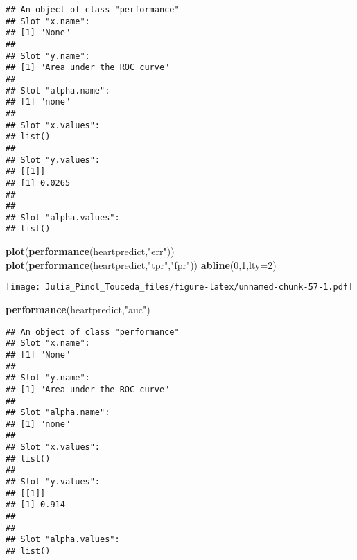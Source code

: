 \documentclass[]{article}
\newenvironment{Shaded}{\begin{snugshade}}{\end{snugshade}}
\newcommand{\KeywordTok}[1]{\textcolor[rgb]{0.13,0.29,0.53}{\textbf{#1}}}
\newcommand{\DataTypeTok}[1]{\textcolor[rgb]{0.13,0.29,0.53}{#1}}
\newcommand{\DecValTok}[1]{\textcolor[rgb]{0.00,0.00,0.81}{#1}}
\newcommand{\FloatTok}[1]{\textcolor[rgb]{0.00,0.00,0.81}{#1}}
\newcommand{\StringTok}[1]{\textcolor[rgb]{0.31,0.60,0.02}{#1}}
\newcommand{\OperatorTok}[1]{\textcolor[rgb]{0.81,0.36,0.00}{\textbf{#1}}}
\newcommand{\NormalTok}[1]{#1}
\begin{document}
\begin{Shaded}
\end{Shaded}

\begin{verbatim}
## An object of class "performance"
## Slot "x.name":
## [1] "None"
## 
## Slot "y.name":
## [1] "Area under the ROC curve"
## 
## Slot "alpha.name":
## [1] "none"
## 
## Slot "x.values":
## list()
## 
## Slot "y.values":
## [[1]]
## [1] 0.0265
## 
## 
## Slot "alpha.values":
## list()
\end{verbatim}

\begin{Shaded}
\begin{Highlighting}[]
\KeywordTok{plot}\NormalTok{(}\KeywordTok{performance}\NormalTok{(heartpredict,}\StringTok{"err"}\NormalTok{))}
\KeywordTok{plot}\NormalTok{(}\KeywordTok{performance}\NormalTok{(heartpredict,}\StringTok{"tpr"}\NormalTok{,}\StringTok{"fpr"}\NormalTok{))}
\KeywordTok{abline}\NormalTok{(}\DecValTok{0}\NormalTok{,}\DecValTok{1}\NormalTok{,}\DataTypeTok{lty=}\DecValTok{2}\NormalTok{)}
\end{Highlighting}
\end{Shaded}

\texttt{[image: Julia\_Pinol\_Touceda\_files/figure-latex/unnamed-chunk-57-1.pdf]}

\begin{Shaded}
\begin{Highlighting}[]
\KeywordTok{performance}\NormalTok{(heartpredict,}\StringTok{"auc"}\NormalTok{)}
\end{Highlighting}
\end{Shaded}

\begin{verbatim}
## An object of class "performance"
## Slot "x.name":
## [1] "None"
## 
## Slot "y.name":
## [1] "Area under the ROC curve"
## 
## Slot "alpha.name":
## [1] "none"
## 
## Slot "x.values":
## list()
## 
## Slot "y.values":
## [[1]]
## [1] 0.914
## 
## 
## Slot "alpha.values":
## list()
\end{verbatim}
\end{document}
